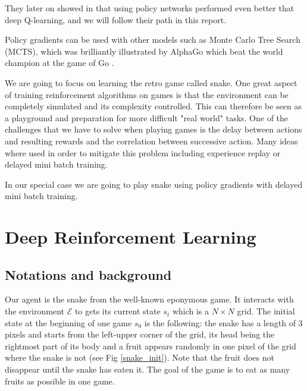 \documentclass{article}
\begin{document}
They later on showed in \cite{mnih2016asynchronous} that using policy networks performed even better that deep Q-learning, and we will follow their path in this report.

Policy gradients can be used with other models such as Monte Carlo Tree Search (MCTS), which was brilliantly illustrated by AlphaGo which beat the world champion at the game of Go \cite{silver2016go}.

We are going to focus on learning the retro game called snake.
One great aspect of training reinforcement algorithms on games is that the environment can be completely simulated and its complexity controlled.
This can therefore be seen as a playground and preparation for more difficult "real world" tasks.
One of the challenges that we have to solve when playing games is the delay between actions and resulting rewards and the correlation between successive action.
Many ideas where used in order to mitigate this problem including experience replay \cite{lin1993reinforcement} or delayed mini batch training.

In our special case we are going to play snake using policy gradients with delayed mini batch training.



\section{Deep Reinforcement Learning}

\subsection{Notations and background}

Our agent is the snake from the well-known eponymous game. It interacts with the environment $\mathcal E$ to gets its current state $s_t$ which is a $N \times N$ grid. The initial state at the beginning of one game $s_0$ is the following: the snake has a length of 3 pixels and starts from the left-upper corner of the grid, its head being the rightmost part of its body and a fruit appears randomly in one pixel of the grid where the snake is not (see Fig \ref{snake_init}). Note that the fruit does not disappear until the snake has eaten it. The goal of the game is to eat as many fruits as possible in one game.
\end{document}
